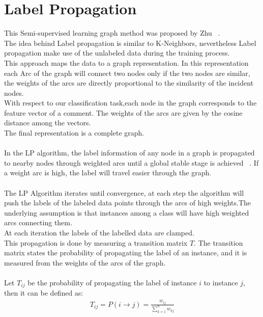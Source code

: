 \documentclass[4pt,a4paper,twocolumn]{article}
\begin{document}
\section{Label Propagation}

This Semi-supervised learning graph method was proposed by Zhu ~\cite{Zhu:2005:SLG:1104523}.\\
The idea behind Label propagation is similar to K-Neighbors, nevertheless Label propagation make use of the unlabeled data during the training process.\\

This approach maps the data to a graph representation.
In this representation each Arc of the graph will connect two nodes only if the two nodes are similar,
the weights of the arcs are directly proportional to the similarity of the incident nodes.\\

With respect to our classification task,each node in the graph corresponds to the feature vector of a comment.
The weights of the arcs are given by the cosine distance among the vectors.\\
The final representation is a complete graph.\\
\\
In the LP algorithm, the label information of any
node in a graph is propagated to nearby nodes
through weighted arcs until a global stable stage is
achieved ~\cite{Chen:2006:REU:1220175.1220192}.
If a weight arc is high, the label will travel easier through the graph.\\
\\
The LP Algorithm iterates until convergence,
at each step the algorithm will push the labels
of the labeled data points through the arcs of high weights.The underlying assumption is that instances among a class will have high weighted arcs
connecting them.\\
At each iteration the labels of the labelled data are clamped.\\

This propagation is done by measuring a transition matrix $T$.
The transition matrix states the probability of propagating the label of an instance,
and it is measured from the weights of the arcs of the graph.\\
\\
Let $T_{ij}$ be the probability of propagating the label of instance $i$ to instance $j$, then it can be defined as:\\
\begin{align}
	T_{ij}=P(i \rightarrow j)=\frac{w_{ij}}{\sum_{k=1}^{n} w_{kj}}
\end{align}
\end{document}
